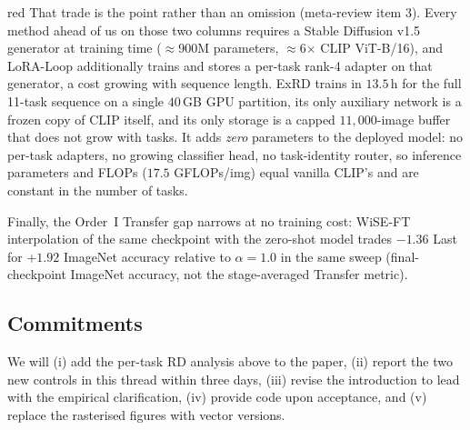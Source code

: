 \documentclass[11pt]{article}
\begin{document}
\begin{color}{red}
That trade is the point rather than an omission (meta-review item 3). Every method ahead of us on those two columns requires a Stable Diffusion v1.5 generator at training time ($\approx$900M parameters, $\approx$6$\times$ CLIP ViT-B/16), and LoRA-Loop additionally trains and stores a per-task rank-4 adapter on that generator, a cost growing with sequence length. ExRD trains in $13.5$\,h for the full 11-task sequence on a single $40$\,GB GPU partition, its only auxiliary network is a frozen copy of CLIP itself, and its only storage is a capped $11{,}000$-image buffer that does not grow with tasks. It adds \emph{zero} parameters to the deployed model: no per-task adapters, no growing classifier head, no task-identity router, so inference parameters and FLOPs ($17.5$ GFLOPs/img) equal vanilla CLIP's and are constant in the number of tasks.

Finally, the Order~I Transfer gap narrows at no training cost: WiSE-FT interpolation of the same checkpoint with the zero-shot model trades $-1.36$ Last for $+1.92$ ImageNet accuracy relative to $\alpha{=}1.0$ in the same sweep (final-checkpoint ImageNet accuracy, not the stage-averaged Transfer metric).

\subsection*{Commitments}

We will (i) add the per-task RD analysis above to the paper, (ii) report the two new controls in this thread within three days, (iii) revise the introduction to lead with the empirical clarification, (iv) provide code upon acceptance, and (v) replace the rasterised figures with vector versions.
\end{color}
\end{document}
